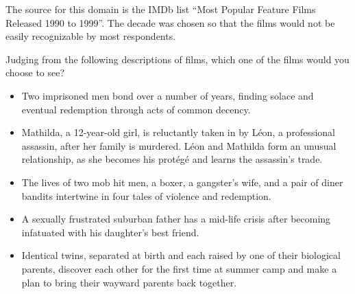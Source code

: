 The source for this domain is the IMDb list ``Most Popular Feature Films Released 1990 to
1999''.
The decade was chosen so that the films would not be easily recognizable by most respondents.

\begin{tcolorbox}
Judging from the following descriptions of films, which one of the films would you choose to see?

\begin{itemize}
	\setlength\itemsep{-15pt}
	\item Two imprisoned men bond over a number of years, finding solace and
eventual redemption through acts of common decency. \\
	\item Mathilda, a 12-year-old girl, is reluctantly taken in by L\'eon, a
professional assassin, after her family is murdered. L\'eon and Mathilda
form an unusual relationship, as she becomes his prot\'eg\'e and learns the
assassin's trade. \\
	\item The lives of two mob hit men, a boxer, a gangster's wife, and a pair
of diner bandits intertwine in four tales of violence and redemption. \\
	\item A sexually frustrated suburban father has a mid-life crisis after
becoming infatuated with his daughter's best friend. \\
	\item Identical twins, separated at birth and each raised by one of their
biological parents, discover each other for the first time at summer camp
and make a plan to bring their wayward parents back together.
\end{itemize}
\end{tcolorbox}
